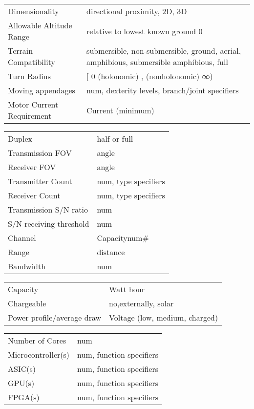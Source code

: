 \begin{center}
\begin{tabularx}{\textwidth}{ |X|X| }
  \hline
  Dimensionality & directional proximity, 2D, 3D \\
  Allowable Altitude Range & relative to lowest known ground 0 \\
  Terrain Compatibility &  submersible, non-submersible, ground, aerial, amphibious, submersible amphibious, full \\ \hline
  Turn Radius &  [ 0 (holonomic) , (nonholonomic) ∞) \\
  Moving appendages &  num, dexterity levels, branch/joint specifiers \\
  Motor Current Requirement &  Current (minimum) \\
  \hline
\end{tabularx}
\end{center}

\begin{center}
\begin{tabularx}{\textwidth}{ |X|X| }
\hline
Duplex & half or full \\
Transmission FOV & angle \\
Receiver FOV & angle \\
Transmitter Count & num, type specifiers \\
Receiver Count & num, type specifiers \\
Transmission S/N ratio & num \\
S/N receiving threshold & num \\
Channel & Capacitynum# \\
Range & distance \\
Bandwidth & num \\
\hline
\end{tabularx}
\end{center}

\begin{center}
\begin{tabularx}{\textwidth}{ |X|X| }
\hline
Capacity & Watt hour \\
Chargeable & no,externally, solar \\
Power profile/average draw & Voltage (low, medium, charged) \\
\hline
\end{tabularx}
\end{center}


\begin{center}
\begin{tabularx}{\textwidth}{ |X|X| }
\hline
Number of Cores &  num \\
Microcontroller(s)  & num, function specifiers \\
ASIC(s)  & num, function specifiers \\
GPU(s)  & num, function specifiers \\
FPGA(s) &  num, function specifiers \\
\hline
\end{tabularx}
\end{center}
